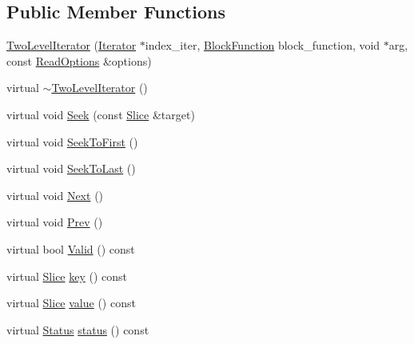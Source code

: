 \subsection*{Public Member Functions}
\begin{DoxyCompactItemize}
\item 
\hyperlink{classleveldb_1_1anonymous__namespace_02two__level__iterator_8cc_03_1_1_two_level_iterator_ac1d49d64903c715e0b4a38ff1203b299}{Two\+Level\+Iterator} (\hyperlink{classleveldb_1_1_iterator}{Iterator} $\ast$index\+\_\+iter, \hyperlink{namespaceleveldb_1_1anonymous__namespace_02two__level__iterator_8cc_03_a5c9432df43722461670c1721d5b43f33}{Block\+Function} block\+\_\+function, void $\ast$arg, const \hyperlink{structleveldb_1_1_read_options}{Read\+Options} \&options)
\item 
virtual \hyperlink{classleveldb_1_1anonymous__namespace_02two__level__iterator_8cc_03_1_1_two_level_iterator_af7892684d519132d09fc437f743f2d05}{$\sim$\+Two\+Level\+Iterator} ()
\item 
virtual void \hyperlink{classleveldb_1_1anonymous__namespace_02two__level__iterator_8cc_03_1_1_two_level_iterator_a35f3800d929d6a99b75fffa7d59f2274}{Seek} (const \hyperlink{classleveldb_1_1_slice}{Slice} \&target)
\item 
virtual void \hyperlink{classleveldb_1_1anonymous__namespace_02two__level__iterator_8cc_03_1_1_two_level_iterator_a7df06512adc06445a807d380c1aa6f60}{Seek\+To\+First} ()
\item 
virtual void \hyperlink{classleveldb_1_1anonymous__namespace_02two__level__iterator_8cc_03_1_1_two_level_iterator_a6290531510ed53c27051fbbe5fd9db67}{Seek\+To\+Last} ()
\item 
virtual void \hyperlink{classleveldb_1_1anonymous__namespace_02two__level__iterator_8cc_03_1_1_two_level_iterator_ae9cadbb5e25e27a6d6b10ff8794e3dfc}{Next} ()
\item 
virtual void \hyperlink{classleveldb_1_1anonymous__namespace_02two__level__iterator_8cc_03_1_1_two_level_iterator_ac5fe263fa573ba6fa3bb0a4754eb5aad}{Prev} ()
\item 
virtual bool \hyperlink{classleveldb_1_1anonymous__namespace_02two__level__iterator_8cc_03_1_1_two_level_iterator_a8bb50b963d4a94afc35742f13f1686ff}{Valid} () const 
\item 
virtual \hyperlink{classleveldb_1_1_slice}{Slice} \hyperlink{classleveldb_1_1anonymous__namespace_02two__level__iterator_8cc_03_1_1_two_level_iterator_a5e241c775eac2a1a9834ebf2f152bfe5}{key} () const 
\item 
virtual \hyperlink{classleveldb_1_1_slice}{Slice} \hyperlink{classleveldb_1_1anonymous__namespace_02two__level__iterator_8cc_03_1_1_two_level_iterator_a6357dcca6de355676bab5a4029bf958c}{value} () const 
\item 
virtual \hyperlink{classleveldb_1_1_status}{Status} \hyperlink{classleveldb_1_1anonymous__namespace_02two__level__iterator_8cc_03_1_1_two_level_iterator_a3094137ae97f702058115d68a7cfdf8b}{status} () const 
\end{DoxyCompactItemize}
